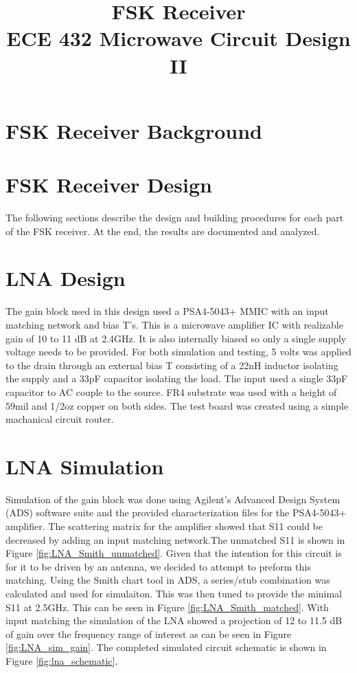 \documentclass[conference]{IEEEtran}
\begin{document}
\title{FSK Receiver\\ECE 432 Microwave Circuit Design II}
\author{
}
\maketitle
\IEEEpeerreviewmaketitle
\section{FSK Receiver Background}

\section{FSK Receiver Design}
The following sections describe the design and building procedures for each part of the FSK receiver.  At the end, the results are documented and analyzed.


\section{LNA Design}
The gain block used in this design used a PSA4-5043+ MMIC with an input matching network and bias T's. This is a microwave amplifier IC with realizable gain of 10 to 11 dB at 2.4GHz. It is also internally biased so only a single supply voltage needs to be provided. For both simulation and testing, 5 volts was applied to the drain through an external bias T consisting of a 22nH inductor isolating the supply and a 33pF capacitor isolating the load. The input used a single 33pF capacitor to AC couple to the source. FR4 substrate was used with a height of 59mil and 1/2oz copper on both sides. The test board was created using a simple machanical circuit router. 

\section{LNA Simulation}
Simulation of the gain block was done using Agilent's Advanced Design System (ADS) software suite and the provided characterization files for the PSA4-5043+ amplifier. The scattering matrix for the amplifier showed that S11 could be decreased by adding an input matching network.The unmatched S11 is shown in Figure \ref{fig:LNA_Smith_unmatched}. Given that the intention for this circuit is for it to be driven by an antenna, we decided to attempt to preform this matching. Using the Smith chart tool in ADS, a series/stub combination was calculated and used for simulaiton. This was then tuned to provide the minimal S11 at 2.5GHz. This can be seen in Figure \ref{fig:LNA_Smith_matched}.  With input matching the simulation of the LNA showed a projection of 12 to 11.5 dB of gain over the frequency range of interest as can be seen in Figure \ref{fig:LNA_sim_gain}. The completed simulated circuit schematic is shown in Figure \ref{fig:lna_schematic}.
\end{document}
